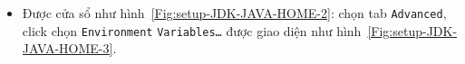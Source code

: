 \documentclass[13pt,a4paper]{extreport}
\begin{document}
\begin{itemize}
\begin{itemize}
				\item Được cửa sổ như hình~\ref{Fig:setup-JDK-JAVA-HOME-2}: chọn tab \verb|Advanced|, click chọn \verb|Environment| \verb|Variables…| được giao diện như hình~\ref{Fig:setup-JDK-JAVA-HOME-3}.				
					
					\begin{figure}[!h]
						\vspace{-.25cm}
						\begin{center}
							\hspace{.5cm}
							\\

\end{center}
\end{figure}
\end{itemize}
\end{itemize}
\end{document}
